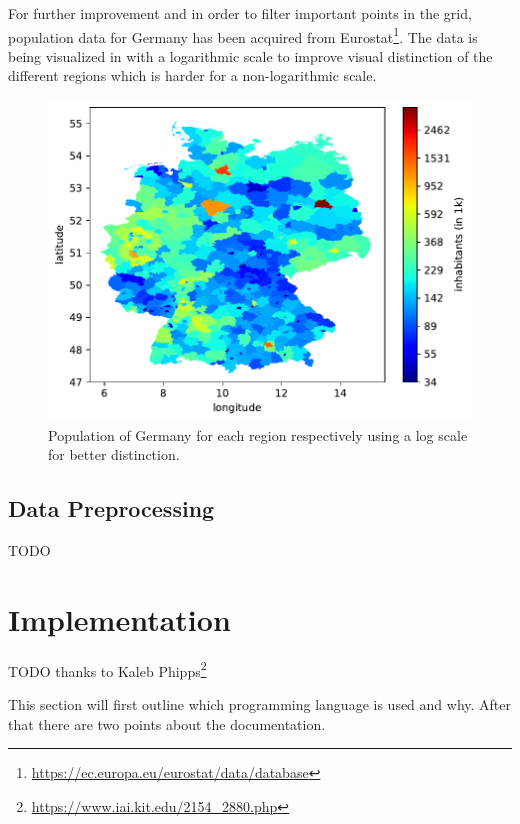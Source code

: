 For further improvement and in order to filter important points in the grid, population data for Germany has been acquired from Eurostat\footnote{\url{https://ec.europa.eu/eurostat/data/database}}. The data is being visualized in  with a logarithmic scale to improve visual distinction of the different regions which is harder for a non-logarithmic scale.\\

\begin{figure}[h!]%
\centering
\includegraphics[width=\textwidth]{plots/demo/demo2018_logscale}%
\caption{Population of Germany for each region respectively using a log scale for better distinction.}%
\label{fig:demo2018_logscale}%
\end{figure}

\subsection*{Data Preprocessing}

TODO


\section{Implementation}
\label{sec:prog}

TODO thanks to Kaleb Phipps\footnote{\url{https://www.iai.kit.edu/2154_2880.php}}

This section will first outline which programming language is used and why. After that there are two points about the documentation.\\

